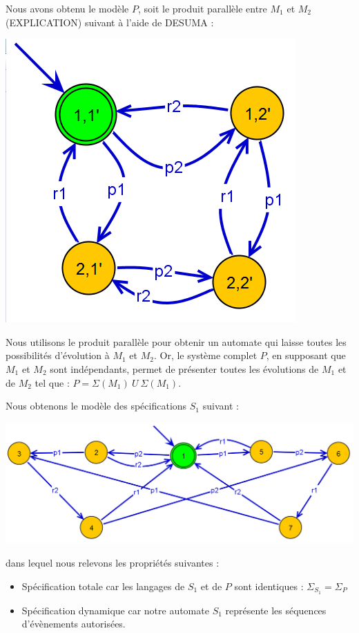 Nous avons obtenu le modèle $P$, soit le produit parallèle entre $M_1$ et $M_2$ (EXPLICATION) suivant à l'aide de DESUMA : 
\begin{center}
\includegraphics[scale=0.5]{I/images/P.png}
\end{center}
Nous utilisons le produit parallèle pour obtenir un automate qui laisse toutes les possibilités d'évolution à $M_1$ et $M_2$. Or, le système complet $P$, en supposant que $M_1$ et $M_2$ sont indépendants, permet de présenter toutes les évolutions de $M_1$ et de $M_2$ tel que : $P = \Sigma(M_1)\ U\ \Sigma(M_1)$.

Nous obtenons le modèle des spécifications $S_1$ suivant :\\
\begin{center}
\includegraphics[scale=0.5]{I//images/S1.png}
\end{center}dans lequel nous relevons les propriétés suivantes :
\begin{itemize}[label = \textbullet]
\item Spécification totale car les langages de $S_1$ et de $P$ sont identiques : $\Sigma_{S_1} = \Sigma_P$
\item Spécification dynamique car notre automate $S_1$ représente les séquences d'évènements autorisées.
\end{itemize}

